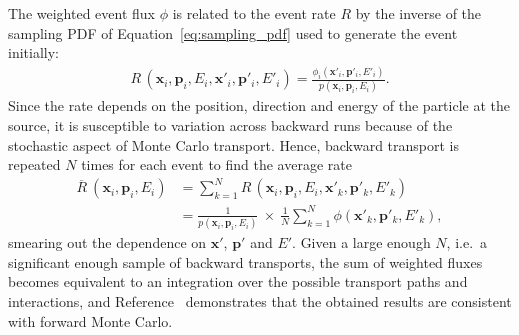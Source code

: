 The weighted event flux $\phi$ is related to the event rate $R$ by the
inverse of the sampling PDF of Equation~\ref{eq:sampling_pdf} used to generate
the event initially:
\begin{align*}
R\,(\bm{x}_i, \bm{p}_i, E_i, \bm{x}'_i, \bm{p}'_i, E'_i) = 
    \frac{\phi_i(\bm{x}'_i, \bm{p}'_i, E'_i)}{p(\bm{x}_i, \bm{p}_i, E_i)}.
\end{align*}
Since the rate depends on the position, direction and energy of the particle at
the source, it is susceptible to variation across backward runs because of the
stochastic aspect of Monte Carlo transport. Hence, backward transport is
repeated $N$ times for each event to find the average rate
\begin{align}\label{eq:avg_rate}
\overline{R}\:(\bm{x}_i, \bm{p}_i, E_i)
    &= \sum_{k=1}^N R\,(\bm{x}_i, \bm{p}_i, E_i, \bm{x}'_k, \bm{p}'_k, E'_k) \nonumber\\
    &= \frac{1}{p(\bm{x}_i, \bm{p}_i, E_i)} \ \times\ \frac{1}{N} \sum_{k=1}^N \phi(\bm{x}'_k, \bm{p}'_k, E'_k),
\end{align}
smearing out the dependence on $\bm{x}'$, $\bm{p}'$ and $E'$. Given a large
enough $N$, i.e.\ a significant enough sample of backward transports, the sum of
weighted fluxes becomes equivalent to an integration over the possible transport paths
and interactions, and Reference~\cite{DESORGHER2010247} demonstrates that the
obtained results are consistent with forward Monte Carlo.











